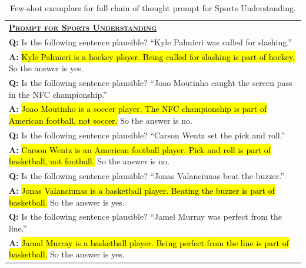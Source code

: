 \begingroup
\begin{table}[H]
    \centering
    \small
    \caption{
    Few-shot exemplars for full chain of thought prompt for Sports Understanding.
    }
    \begin{tabular}{p{\linewidth}}
        \toprule
        \underline{\textbf{\textsc{Prompt for Sports Understanding}}} \\
        \vspace{-2mm}
        \textbf{Q:} Is the following sentence plausible? ``Kyle Palmieri was called for slashing.'' \\
        \vspace{-1mm}
        \textbf{A:} \hl{Kyle Palmieri is a hockey player. Being called for slashing is part of hockey.} So the answer is yes. \\
        \vspace{0mm}
        \textbf{Q:} Is the following sentence plausible? ``Joao Moutinho caught the screen pass in the NFC championship.'' \\
        \vspace{-1mm}
        \textbf{A:} \hl{Joao Moutinho is a soccer player. The NFC championship is part of American football, not soccer.} So the answer is no. \\
        \vspace{0mm}
        \textbf{Q:} Is the following sentence plausible? ``Carson Wentz set the pick and roll.'' \\
        \vspace{-1mm}
        \textbf{A:} \hl{Carson Wentz is an American football player. Pick and roll is part of basketball, not football.} So the answer is no. \\
        \vspace{0mm}
        \textbf{Q:} Is the following sentence plausible? ``Jonas Valanciunas beat the buzzer.'' \\
        \vspace{-1mm}
        \textbf{A:} \hl{Jonas Valanciunas is a basketball player. Beating the buzzer is part of basketball.} So the answer is yes. \\
        \vspace{0mm}
        \textbf{Q:} Is the following sentence plausible? ``Jamel Murray was perfect from the line.'' \\
        \vspace{-1mm}
        \textbf{A:} \hl{Jamal Murray is a basketball player. Being perfect from the line is part of basketball.}  So the answer is yes. \\

\end{tabular}
\end{table}
